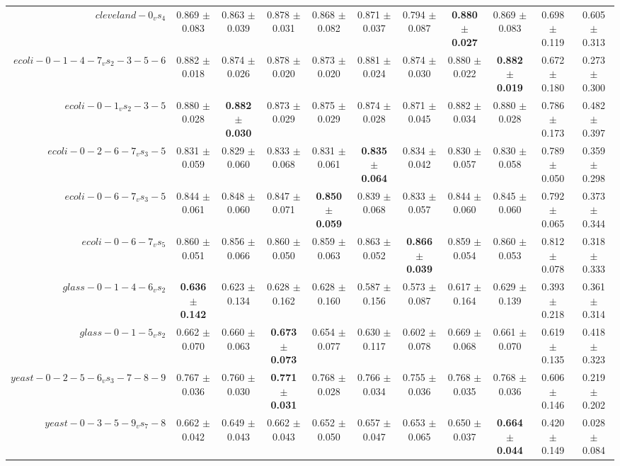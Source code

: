 \begin{table}[!ht]
{\begin{tabular}{r c c c c c c c c c c}
$cleveland-0_vs_4$ & 0.869 $\pm$ 0.083 & 0.863 $\pm$ 0.039 & 0.878 $\pm$ 0.031 & 0.868 $\pm$ 0.082 & 0.871 $\pm$ 0.037 & 0.794 $\pm$ 0.087 & \textbf{0.880 $\pm$ 0.027} & 0.869 $\pm$ 0.083 & 0.698 $\pm$ 0.119 & 0.605 $\pm$ 0.313 \\
$ecoli-0-1-4-7_vs_2-3-5-6$ & 0.882 $\pm$ 0.018 & 0.874 $\pm$ 0.026 & 0.878 $\pm$ 0.020 & 0.873 $\pm$ 0.020 & 0.881 $\pm$ 0.024 & 0.874 $\pm$ 0.030 & 0.880 $\pm$ 0.022 & \textbf{0.882 $\pm$ 0.019} & 0.672 $\pm$ 0.180 & 0.273 $\pm$ 0.300 \\
$ecoli-0-1_vs_2-3-5$ & 0.880 $\pm$ 0.028 & \textbf{0.882 $\pm$ 0.030} & 0.873 $\pm$ 0.029 & 0.875 $\pm$ 0.029 & 0.874 $\pm$ 0.028 & 0.871 $\pm$ 0.045 & 0.882 $\pm$ 0.034 & 0.880 $\pm$ 0.028 & 0.786 $\pm$ 0.173 & 0.482 $\pm$ 0.397 \\
$ecoli-0-2-6-7_vs_3-5$ & 0.831 $\pm$ 0.059 & 0.829 $\pm$ 0.060 & 0.833 $\pm$ 0.068 & 0.831 $\pm$ 0.061 & \textbf{0.835 $\pm$ 0.064} & 0.834 $\pm$ 0.042 & 0.830 $\pm$ 0.057 & 0.830 $\pm$ 0.058 & 0.789 $\pm$ 0.050 & 0.359 $\pm$ 0.298 \\
$ecoli-0-6-7_vs_3-5$ & 0.844 $\pm$ 0.061 & 0.848 $\pm$ 0.060 & 0.847 $\pm$ 0.071 & \textbf{0.850 $\pm$ 0.059} & 0.839 $\pm$ 0.068 & 0.833 $\pm$ 0.057 & 0.844 $\pm$ 0.060 & 0.845 $\pm$ 0.060 & 0.792 $\pm$ 0.065 & 0.373 $\pm$ 0.344 \\
$ecoli-0-6-7_vs_5$ & 0.860 $\pm$ 0.051 & 0.856 $\pm$ 0.066 & 0.860 $\pm$ 0.050 & 0.859 $\pm$ 0.063 & 0.863 $\pm$ 0.052 & \textbf{0.866 $\pm$ 0.039} & 0.859 $\pm$ 0.054 & 0.860 $\pm$ 0.053 & 0.812 $\pm$ 0.078 & 0.318 $\pm$ 0.333 \\
$glass-0-1-4-6_vs_2$ & \textbf{0.636 $\pm$ 0.142} & 0.623 $\pm$ 0.134 & 0.628 $\pm$ 0.162 & 0.628 $\pm$ 0.160 & 0.587 $\pm$ 0.156 & 0.573 $\pm$ 0.087 & 0.617 $\pm$ 0.164 & 0.629 $\pm$ 0.139 & 0.393 $\pm$ 0.218 & 0.361 $\pm$ 0.314 \\
$glass-0-1-5_vs_2$ & 0.662 $\pm$ 0.070 & 0.660 $\pm$ 0.063 & \textbf{0.673 $\pm$ 0.073} & 0.654 $\pm$ 0.077 & 0.630 $\pm$ 0.117 & 0.602 $\pm$ 0.078 & 0.669 $\pm$ 0.068 & 0.661 $\pm$ 0.070 & 0.619 $\pm$ 0.135 & 0.418 $\pm$ 0.323 \\
$yeast-0-2-5-6_vs_3-7-8-9$ & 0.767 $\pm$ 0.036 & 0.760 $\pm$ 0.030 & \textbf{0.771 $\pm$ 0.031} & 0.768 $\pm$ 0.028 & 0.766 $\pm$ 0.034 & 0.755 $\pm$ 0.036 & 0.768 $\pm$ 0.035 & 0.768 $\pm$ 0.036 & 0.606 $\pm$ 0.146 & 0.219 $\pm$ 0.202 \\
$yeast-0-3-5-9_vs_7-8$ & 0.662 $\pm$ 0.042 & 0.649 $\pm$ 0.043 & 0.662 $\pm$ 0.043 & 0.652 $\pm$ 0.050 & 0.657 $\pm$ 0.047 & 0.653 $\pm$ 0.065 & 0.650 $\pm$ 0.037 & \textbf{0.664 $\pm$ 0.044} & 0.420 $\pm$ 0.149 & 0.028 $\pm$ 0.084 \\

\end{tabular}}
\end{table}

